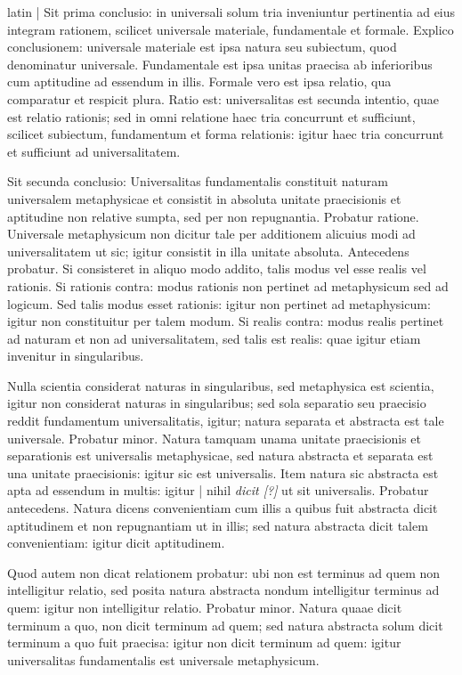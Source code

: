 \begin{otherlanguage*}{latin}
\pstart
  \textnormal{|}   Sit prima conclusio: in universali solum tria inveniuntur pertinentia ad eius integram rationem, scilicet universale materiale, fundamentale et formale. Explico conclusionem: universale materiale est ipsa natura seu subiectum, quod denominatur universale. Fundamentale est ipsa unitas praecisa ab inferioribus cum aptitudine ad essendum in illis. Formale vero est ipsa relatio, qua comparatur et respicit plura. Ratio est: universalitas est secunda intentio, quae est relatio rationis; sed in omni relatione haec tria concurrunt et sufficiunt, scilicet subiectum, fundamentum et forma relationis: igitur haec tria concurrunt et sufficiunt ad universalitatem. 
\pend

\pstart
  Sit secunda conclusio: Universalitas fundamentalis constituit naturam universalem metaphysicae et consistit in absoluta unitate praecisionis et aptitudine non relative sumpta, sed per non repugnantia. Probatur ratione. Universale metaphysicum non dicitur tale per additionem alicuius modi ad universalitatem ut sic; igitur consistit in illa unitate absoluta. Antecedens probatur. Si consisteret in aliquo modo addito, talis modus vel esse realis vel rationis. Si rationis contra: modus rationis non pertinet ad metaphysicum sed ad logicum. Sed talis modus esset rationis: igitur non pertinet ad metaphysicum: igitur non constituitur per talem modum. Si realis contra: modus realis pertinet ad naturam et non ad universalitatem, sed talis est realis: quae igitur etiam invenitur in singularibus. 
\pend

\pstart
  Nulla scientia considerat naturas in singularibus, sed metaphysica est scientia, igitur non considerat naturas in singularibus; sed sola separatio seu praecisio reddit fundamentum universalitatis, igitur; natura separata et abstracta est tale universale. Probatur minor. Natura tamquam unama unitate praecisionis et separationis est universalis metaphysicae, sed natura abstracta et separata est una unitate praecisionis: igitur sic est universalis. Item natura sic abstracta est apta ad essendum in multis: igitur \textnormal{|} nihil \emph{dicit [?]} ut sit universalis. Probatur antecedens. Natura dicens convenientiam cum illis a quibus fuit abstracta dicit aptitudinem et non repugnantiam ut in illis; sed natura abstracta dicit talem convenientiam: igitur dicit aptitudinem. 
\pend

\pstart
  Quod autem non dicat relationem probatur: ubi non est terminus ad quem non intelligitur relatio, sed posita natura abstracta nondum intelligitur terminus ad quem: igitur non intelligitur relatio. Probatur minor. Natura quaae dicit terminum a quo, non dicit terminum ad quem; sed natura abstracta solum dicit terminum a quo fuit praecisa: igitur non dicit terminum ad quem: igitur universalitas fundamentalis est universale metaphysicum. 
\pend


\end{otherlanguage*}
